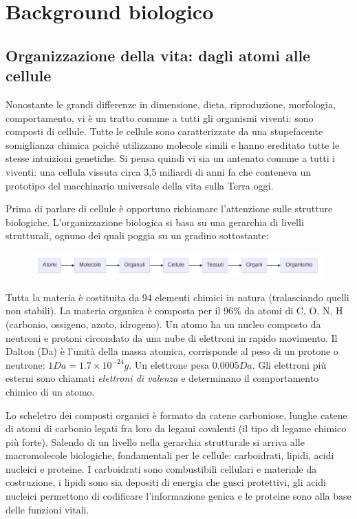 \clearpage

\section{Background biologico}
\subsection{Organizzazione della vita: dagli atomi alle cellule}
Nonostante le grandi differenze in dimensione, dieta, riproduzione, morfologia, comportamento, vi è un tratto comune a tutti gli organismi viventi: sono composti di cellule. Tutte le cellule sono caratterizzate da una stupefacente somiglianza chimica poiché utilizzano molecole simili e hanno ereditato tutte le stesse intuizioni genetiche. Si pensa quindi vi sia un antenato comune a tutti i viventi: una cellula vissuta circa 3,5 miliardi di anni fa che conteneva un prototipo del macchinario universale della vita sulla Terra oggi\cite{alberts2018essential}.

\par Prima di parlare di cellule è opportuno richiamare l'attenzione sulle strutture biologiche. L'organizzazione biologica si basa su una gerarchia di livelli strutturali, ognuno dei quali poggia su un gradino sottostante: 

\begin{figure}[h]
	\centering
	\includegraphics[scale=0.45] {images/strutture_biologiche.png}
\end{figure}

Tutta la materia è costituita da 94 elementi chimici in natura (tralasciando quelli non stabili). La materia organica è composta per il 96\% da atomi di C, O, N, H (carbonio, ossigeno, azoto, idrogeno). Un atomo ha un nucleo composto da neutroni e protoni circondato da una nube di elettroni in rapido movimento. Il Dalton (Da) è l'unità della massa atomica, corrisponde al peso di un protone o neutrone: $1 Da = 1.7 \times 10^{-24}g$. Un elettrone pesa $0.0005 Da$. Gli elettroni più esterni sono chiamati \textit{elettroni di valenza} e determinano il comportamento chimico di un atomo.

\par Lo scheletro dei composti organici è formato da catene carboniose, lunghe catene di atomi di carbonio legati fra loro da legami covalenti (il tipo di legame chimico più forte). Salendo di un livello nella gerarchia strutturale si arriva alle macromolecole biologiche, fondamentali per le cellule: carboidrati, lipidi, acidi nucleici e proteine. I carboidrati sono combustibili cellulari e materiale da costruzione, i lipidi sono sia depositi di energia che gusci protettivi, gli acidi nucleici permettono di codificare l'informazione genica e le proteine sono alla base delle funzioni vitali.\\

